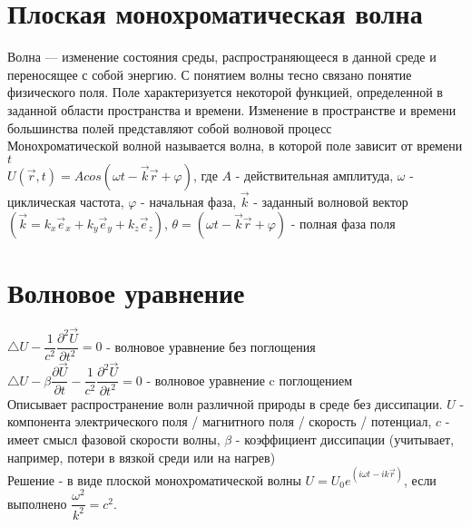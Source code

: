 \newcommand{\colontitulAutors}{astronom\_v\_cube,~edombek}
\newcommand{\colontitulYear}{2023~}
\newcommand{\colontitulEducationalSubject}{Физика волновых процессов}
\newcommand{\colontitulTeacher}{Петров Е. Ю.}



\newcommand{\rot}{\operatorname{rot}}


	\small
	\begin{multicols*}{2}

		\section{Плоская монохроматическая волна}
		Волна — изменение состояния среды, распространяющееся в данной среде и переносящее с собой энергию. С понятием волны тесно связано понятие физического поля. Поле характеризуется некоторой функцией, определенной в заданной области пространства и времени. Изменение в пространстве и времени большинства полей представляют собой волновой процесс\\
		Монохроматической волной называется волна, в которой поле зависит от времени $t$\\
		$U(\vec{r}, t) = A cos(\omega t - \vec{k} \vec{r} + \varphi )$, где $A$ - действительная амплитуда, $\omega$ - циклическая частота, $\varphi $ - начальная фаза, $\vec{k}$ - заданный волновой вектор $(\vec{k} = k_x \vec{e}_x + k_y \vec{e}_y + k_z \vec{e}_z)$, $\theta = (\omega t - \vec{k} \vec{r} + \varphi )$ - полная фаза поля

		\section{Волновое уравнение}
		$\bigtriangleup U - \dfrac{1}{c^2} \dfrac{\partial^2 \vec{U}}{\partial t^2} = 0$ - волновое уравнение без поглощения\\
		$\bigtriangleup U - \beta\dfrac{\partial\vec{U}}{\partial t} -\dfrac{1}{c^2} \dfrac{\partial^2 \vec{U}}{\partial t^2} = 0$ - волновое уравнение c поглощением\\
		Описывает распространение волн различной природы в среде без диссипации.
		$U$ - компонента электрического поля / магнитного поля / скорость / потенциал, $c$ - имеет смысл фазовой скорости волны, $\beta$ - коэффициент диссипации (учитывает, например, потери в вязкой среди или на нагрев)\\
		Решение - в виде плоской монохроматической волны $U = U_0 e^{(i\omega t - i k \vec{r})}$, если выполнено $\dfrac{\omega^2}{k^2} = c^2$.


\end{multicols*}
